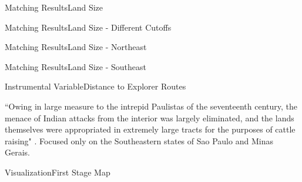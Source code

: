 \documentclass[aspectratio=1610]{beamer}
\begin{document}
\begin{frame}{Matching Results}{Land Size}
    \small
    
\end{frame}

\begin{frame}{Matching Results}{Land Size - Different Cutoffs}
    \small
    
\end{frame}


\begin{frame}{Matching Results}{Land Size - Northeast}
    \small
    
\end{frame}

\begin{frame}{Matching Results}{Land Size - Southeast}
    \small
    
\end{frame}

\begin{frame}{Instrumental Variable}{Distance to Explorer Routes}
    \begin{outline}
        \1 ``Owing in large measure to the intrepid Paulistas of the seventeenth century, the menace of Indian attacks from the interior was largely eliminated, and the lands themselves were appropriated in extremely large tracts for the purposes of cattle raising" \parencite[p.~320]{Smith1972-dv}.
        \vspace{2mm}
        \1 Focused only on the Southeastern states of Sao Paulo and Minas Gerais.
    \end{outline}
\end{frame}

\begin{frame}{Visualization}{First Stage Map}
    \begin{figure}[h!]
        \begin{center}
        \end{center}
      \end{figure}
\end{frame}
\end{document}
